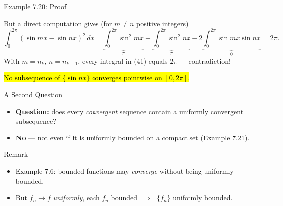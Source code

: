 \documentclass[aspectratio=169,12pt,t]{beamer}
\begin{document}
{\begin{frame}{Example 7.20: Proof}
  \begin{proofblock}{But a direct computation gives (for $m \ne n$ positive integers)}
    \[
      \int_0^{2\pi} (\sin mx - \sin nx)^2\,dx
      = \underbrace{\int_0^{2\pi}\!\sin^2 mx}_{\pi}
      + \underbrace{\int_0^{2\pi}\!\sin^2 nx}_{\pi}
      - 2\underbrace{\int_0^{2\pi}\!\sin mx \sin nx}_{0}
      = 2\pi.
    \]
    With $m = n_k$, $n = n_{k+1}$, every integral in (41) equals
    $2\pi$ --- \alert{contradiction!}
  \end{proofblock}

  \vspace{0.3em}
  \begin{center}
    \hl{$\boxed{\text{No subsequence of } \{\sin nx\} \text{ converges pointwise on } [0, 2\pi].}$}
  \end{center}

\end{frame}

\begin{frame}{A Second Question}
  \begin{hlbox}
  \begin{itemize}
    \item \textbf{Question:} does every \emph{convergent} sequence contain a
      \alert{uniformly convergent} subsequence?
    \item \textbf{No} --- not even if it is uniformly bounded on a compact
      set (Example 7.21).
  \end{itemize}
  \end{hlbox}

  \vspace{0.3em}
  \begin{remblock}{Remark}
    \begin{itemize}
      \item Example 7.6: bounded functions may \emph{converge} without being
        uniformly bounded.
      \item But $f_n \to f$ \emph{uniformly}, each $f_n$ bounded
        $\;\Longrightarrow\;$ $\{f_n\}$ \alert{uniformly bounded}.
    \end{itemize}
  \end{remblock}


\end{frame}}
\end{document}
